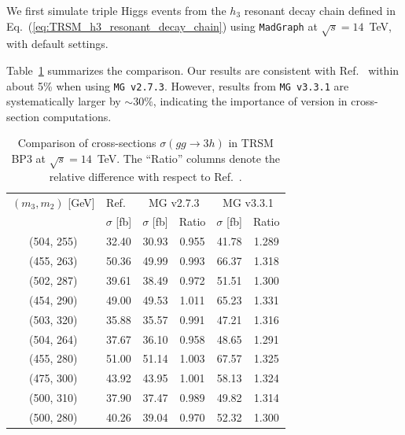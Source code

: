 \documentclass[12pt]{article}
\begin{document}
        We first simulate triple Higgs events from the $h_3$ resonant decay chain defined in Eq.~(\ref{eq:TRSM_h3_resonant_decay_chain}) using \verb|MadGraph| at $\sqrt{s} = 14$~TeV, with default settings.  

        Table~\ref{tab:trsm_xs_comparison_v1} summarizes the comparison. Our results are consistent with Ref.~\cite{Papaefstathiou:2020lyp} within about 5\% when using \verb|MG v2.7.3|. However, results from \verb|MG v3.3.1| are systematically larger by $\sim 30\%$, indicating the importance of version in cross-section computations.
        \begin{table}[htpb]
            \centering
            \caption{Comparison of cross-sections $\sigma(gg \to 3h)$ in TRSM BP3 at $\sqrt{s} = 14$~TeV. The ``Ratio'' columns denote the relative difference with respect to Ref.~\cite{Papaefstathiou:2020lyp}.}
            \label{tab:trsm_xs_comparison_v1}
            \begin{tabular}{c|c|cc|cc}
                $(m_3, m_2)$ [GeV] & Ref.~\cite{Papaefstathiou:2020lyp} & \multicolumn{2}{c|}{MG v2.7.3} & \multicolumn{2}{c}{MG v3.3.1} \\ \cline{2-6} 
                                   & $\sigma$ [fb] & $\sigma$ [fb] & Ratio & $\sigma$ [fb] & Ratio \\ \hline
                (504, 255) & 32.40 & 30.93 & 0.955 & 41.78 & 1.289 \\
                (455, 263) & 50.36 & 49.99 & 0.993 & 66.37 & 1.318 \\
                (502, 287) & 39.61 & 38.49 & 0.972 & 51.51 & 1.300 \\
                (454, 290) & 49.00 & 49.53 & 1.011 & 65.23 & 1.331 \\
                (503, 320) & 35.88 & 35.57 & 0.991 & 47.21 & 1.316 \\
                (504, 264) & 37.67 & 36.10 & 0.958 & 48.65 & 1.291 \\
                (455, 280) & 51.00 & 51.14 & 1.003 & 67.57 & 1.325 \\
                (475, 300) & 43.92 & 43.95 & 1.001 & 58.13 & 1.324 \\
                (500, 310) & 37.90 & 37.47 & 0.989 & 49.82 & 1.314 \\
                (500, 280) & 40.26 & 39.04 & 0.970 & 52.32 & 1.300  
            \end{tabular}
        \end{table}
\end{document}
